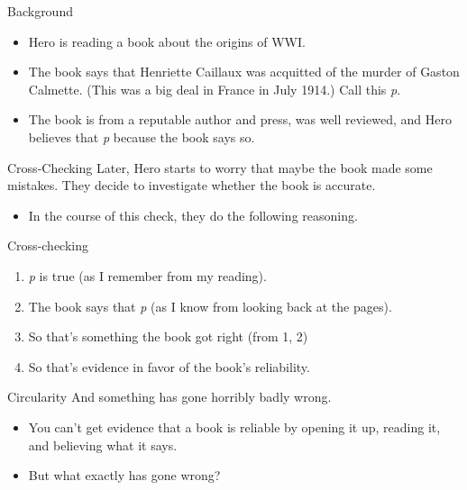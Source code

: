 \documentclass[
  17pt,
  letterpaper,
  ignorenonframetext,
  aspectratio=169,
  xcolor={dvipsnames}]{beamer}
\providecommand{\tightlist}{%
  \setlength{\itemsep}{0pt}\setlength{\parskip}{0pt}}\usepackage{longtable,booktabs,array}
\begin{document}
\begin{frame}{Background}
\protect\hypertarget{background}{}
\begin{itemize}[<+->]
\tightlist
\item
  Hero is reading a book about the origins of WWI.
\item
  The book says that Henriette Caillaux was acquitted of the murder of
  Gaston Calmette. (This was a big deal in France in July 1914.) Call
  this \emph{p}.
\item
  The book is from a reputable author and press, was well reviewed, and
  Hero believes that \emph{p} because the book says so.
\end{itemize}
\end{frame}

\begin{frame}{Cross-Checking}
\protect\hypertarget{cross-checking}{}
Later, Hero starts to worry that maybe the book made some mistakes. They
decide to investigate whether the book is accurate.

\begin{itemize}[<+->]
\tightlist
\item
  In the course of this check, they do the following reasoning.
\end{itemize}
\end{frame}

\begin{frame}{Cross-checking}
\protect\hypertarget{cross-checking-1}{}
\begin{enumerate}[<+->]
\tightlist
\item
  \emph{p} is true (as I remember from my reading).
\item
  The book says that \emph{p} (as I know from looking back at the
  pages).
\item
  So that's something the book got right (from 1, 2)
\item
  So that's evidence in favor of the book's reliability.
\end{enumerate}
\end{frame}

\begin{frame}{Circularity}
\protect\hypertarget{circularity-1}{}
And something has gone horribly badly wrong.

\begin{itemize}[<+->]
\tightlist
\item
  You can't get evidence that a book is reliable by opening it up,
  reading it, and believing what it says.
\item
  But what exactly has gone wrong?
\end{itemize}
\end{frame}
\end{document}
